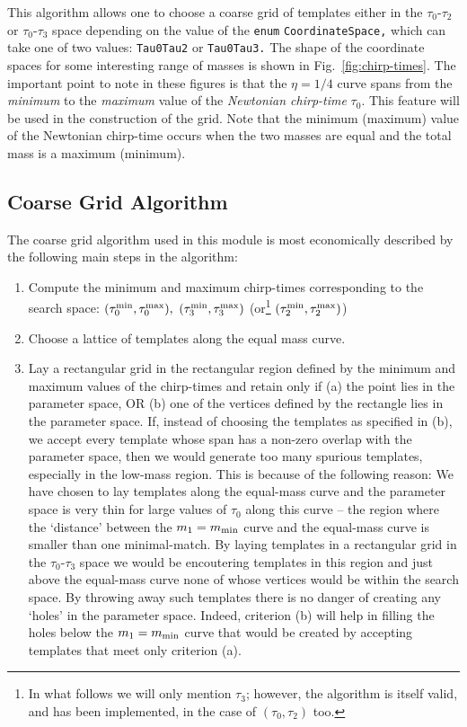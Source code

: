 This algorithm allows one to choose
a coarse grid of templates either in the $\tau_0$-$\tau_2$
or $\tau_0$-$\tau_3$ space depending on the value of the
\texttt {enum} 
\texttt {CoordinateSpace,} which can take one of two values:
\texttt {Tau0Tau2} or \texttt {Tau0Tau3.} The shape of the coordinate
spaces for some interesting range of masses is shown 
in Fig.~\ref{fig:chirp-times}. The important point to note in these
figures is that the $\eta=1/4$ curve spans from the {\it minimum} to the
{\it maximum} value of the {\it Newtonian chirp-time} $\tau_0.$  This
feature will be used in the construction of the grid. Note that
the minimum (maximum) value of the Newtonian chirp-time occurs when 
the two masses are equal and the total mass is a maximum (minimum).

\subsection{Coarse Grid Algorithm}

The coarse grid algorithm used in this module is most economically
described by the following main steps in the algorithm:
\begin{enumerate}
\item Compute the minimum and maximum chirp-times corresponding to the
search space: $(\tau_0^{\rm min}, \tau_0^{\rm max}),$
$(\tau_3^{\rm min}, \tau_3^{\rm max})$ (or\footnote{In what follows
we will only mention $\tau_3$; however, the algorithm is itself valid,
and has been implemented, in the case of $(\tau_0,\tau_2)$ too.}
$(\tau_2^{\rm min}, \tau_2^{\rm max})$) 

 \item Choose a lattice of templates along the equal mass curve.

\item Lay a rectangular grid in the rectangular region defined by
the minimum and maximum values of the chirp-times and retain only
if (a) the point lies in the parameter space, OR (b) one of the
vertices defined by the rectangle lies in the parameter space.
If, instead of choosing the templates as specified in (b), we accept 
every template whose span has a non-zero overlap with the parameter 
space, then we
would generate too many spurious templates, especially in the low-mass
region. This is because of the following reason:
We have chosen to lay templates along the
equal-mass curve and the parameter space is very thin for large values
of $\tau_0$ along this curve -- the region where the `distance'
between the $m_1=m_{\rm min}$ curve and the equal-mass curve is
smaller than one minimal-match.
By laying templates in a rectangular grid in the
$\tau_0$-$\tau_3$ space we would be encoutering templates in this
region and just above the equal-mass curve
none of whose vertices would be within the search space. By
throwing away such templates there is no danger of creating any
`holes' in the parameter space. Indeed, criterion (b) 
will help in filling the holes below the $m_1=m_{\rm min}$ 
curve that would be created by accepting templates that meet
only criterion (a).
 
\end{enumerate}

